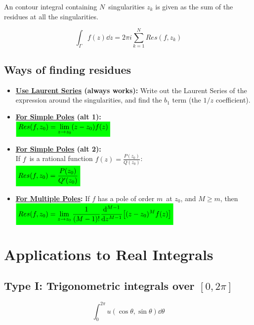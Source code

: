 \documentclass[10pt,a4paper]{article}
\newcommand{\gr}[1]{\colorbox{green}{$\displaystyle #1$}}
\begin{document}
\begin{multicols}{2}
An contour integral containing $N$ singularities $z_k$ is given as the sum of the residues at all the singularities.

\[
    \int_\Gamma f(z) \dd{z} = 2\pi i \sum_{k=1}^N Res(f,z_k)
\]

\subsection*{Ways of finding residues}
\begin{itemize}
    \item \textbf{\underline{Use Laurent Series} (always works):} Write out the Laurent Series of the expression around the singularities, and find the $b_1$ term (the $1/z$ coefficient).
    \item \textbf{\underline{For Simple Poles} (alt 1):} \\
    $\gr{Res(f, z_0) = \lim\limits_{z\rightarrow z_0}(z-z_0)f(z)}$\\
    \item \textbf{\underline{For Simple Poles} (alt 2):}\\
    If $f$ is a rational function $f(z) = \frac{P(z_0)}{Q(z_0)}$:\\
    $\gr{Res(f,z_0) = \frac{P(z_0)}{Q'(z_0)}}$
    \item \textbf{\underline{For Multiple Poles}:} If $f$ has a pole of order $m$ at $z_0$, and $M\geq m$, then\\
    $\gr{Res(f,z_0) = \lim\limits_{z\rightarrow z_0} \frac{1}{(M-1)!} \dv[M-1]{z}\qty[(z-z_0)^M f(z)]}$
\end{itemize}




\newpage
\section*{Applications to Real Integrals}
\subsection*{Type I: Trigonometric integrals over $[0, 2\pi]$}
\[
    \int_0^{2\pi} u(\cos{\theta}, \sin{\theta}) \dd{\theta}
\]


\end{multicols}
\end{document}
